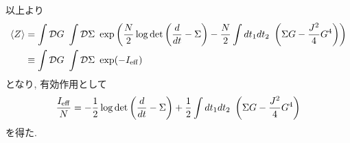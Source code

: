 	以上より
	\begin{align}
	\langle Z \rangle &= \int \mathcal{D}G \ \int \mathcal{D}\Sigma \ 
		\exp\left(
		\frac{N}{2}\log\det\left(\frac{d}{dt} - \Sigma\right)
		- \frac{N}{2}\int dt_1dt_2\ \left(\Sigma G - \frac{J^2}{4}G^4\right)
		\right)\nonumber\\
	&\equiv \int \mathcal{D}G \ \int \mathcal{D}\Sigma \ \exp(-I_{\mathrm{eff}})
	\end{align}
	となり, 有効作用として
	\begin{align}
	\frac{I_{\mathrm{eff}}}{N} =
		- \frac{1}{2}\log\det\left(\frac{d}{dt} - \Sigma\right)
		+ \frac{1}{2}\int dt_1dt_2\ \left(\Sigma G - \frac{J^2}{4}G^4\right)
	\end{align}
	を得た. 

	\pagebreak
